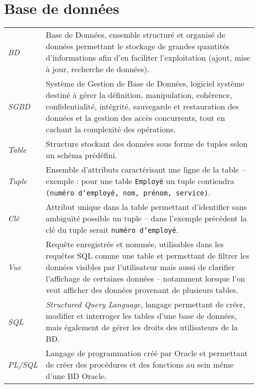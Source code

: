 \section{Base de données}
	\begin{longtable}{>{\itshape}p{}p{}}
		BD		& Base de Données, ensemble structuré et organisé de données permettant le stockage de grandes quantités d’informations afin d’en faciliter l’exploitation (ajout, mise à jour, recherche de données).
		\vspace{2mm}\\
		SGBD	& Système de Gestion de Base de Données, logiciel système destiné à gérer la définition, manipulation, cohérence, confidentialité, intégrité, sauvegarde et restauration des données et la gestion des accès concurrents, tout en cachant la complexité des opérations.
		\vspace{2mm}\\
		Table	& Structure stockant des données sous forme de tuples selon un schéma prédéfini.
		\vspace{2mm}\\
		Tuple	& Ensemble d'attributs caractérisant une ligne de la table -- exemple : pour une table \texttt{Employé} un tuple contiendra \texttt{(numéro d'employé, nom, prénom, service)}.
		\vspace{2mm}\\
		Clé		& Attribut unique dans la table permettant d'identifier sans ambiguïté possible un tuple -- dans l'exemple précédent la clé du tuple serait \texttt{numéro d'employé}.\vspace{2mm}\\
		Vue	& Requête enregistrée et nommée, utilisables dans les requêtes SQL comme une table et permettant de filtrer les données visibles par l'utilisateur mais aussi de clarifier l'affichage de certaines données -- notamment lorsque l'on veut afficher des données provenant de plusieurs tables.
		\vspace{2mm}\\
		SQL	& \textit{Structured Query Language}, langage permettant de créer, modifier et interroger les tables d’une base de données, mais également de gérer les droits des utilisateurs de la BD.
		\vspace{2mm}\\
		PL/SQL	& Langage de programmation créé par Oracle et permettant de créer des procédures et des fonctions au sein même d'une BD Oracle.
		\vspace{2mm}\\

\end{longtable}
